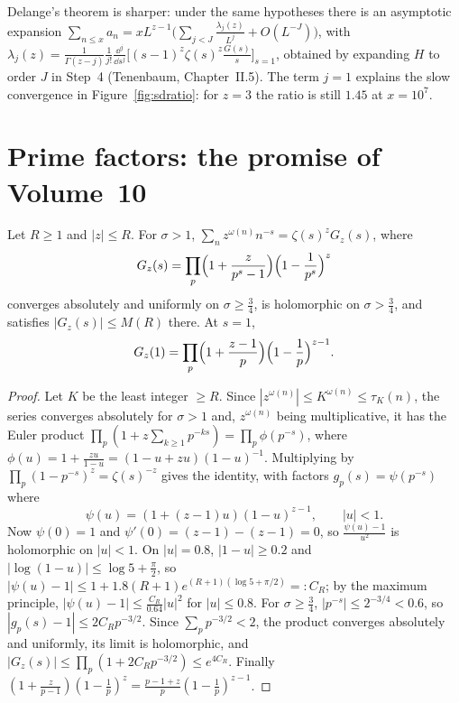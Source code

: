 \begin{remark}
Delange's theorem is sharper: under the same hypotheses there is an asymptotic expansion $\sum_{n\le x}a_n=xL^{z-1}\bigl(\sum_{j<J}\frac{\lambda_j(z)}{L^j}+O(L^{-J})\bigr)$, with $\lambda_j(z)=\frac1{\Gamma(z-j)}\frac1{j!}\frac{\dd^j}{\dd s^j}\bigl[(s-1)^z\zeta(s)^z\frac{G(s)}s\bigr]_{s=1}$, obtained by expanding $H$ to order $J$ in Step~4 (Tenenbaum, Chapter~II.5). The term $j=1$ explains the slow convergence in Figure~\ref{fig:sdratio}: for $z=3$ the ratio is still $1.45$ at $x=10^7$.
\end{remark}

\section{Prime factors: the promise of Volume~10}

\begin{lemma}\label{lem:eulerprod}
Let $R\ge1$ and $|z|\le R$. For $\sigma>1$, $\sum_nz^{\omega(n)}n^{-s}=\zeta(s)^zG_z(s)$, where
\[
G_z(s)=\prod_p\Bigl(1+\frac z{p^s-1}\Bigr)\Bigl(1-\frac1{p^s}\Bigr)^z
\]
converges absolutely and uniformly on $\sigma\ge\frac34$, is holomorphic on $\sigma>\frac34$, and satisfies $|G_z(s)|\le M(R)$ there. At $s=1$,
\[
G_z(1)=\prod_p\Bigl(1+\frac{z-1}p\Bigr)\Bigl(1-\frac1p\Bigr)^{z-1}.
\]
\end{lemma}
\begin{proof}
Let $K$ be the least integer $\ge R$. Since $|z^{\omega(n)}|\le K^{\omega(n)}\le\tau_K(n)$, the series converges absolutely for $\sigma>1$ and, $z^{\omega(n)}$ being multiplicative, it has the Euler product $\prod_p(1+z\sum_{k\ge1}p^{-ks})=\prod_p\phi(p^{-s})$, where $\phi(u)=1+\frac{zu}{1-u}=(1-u+zu)(1-u)^{-1}$. Multiplying by $\prod_p(1-p^{-s})^z=\zeta(s)^{-z}$ gives the identity, with factors $g_p(s)=\psi(p^{-s})$ where
\[
\psi(u)=(1+(z-1)u)(1-u)^{z-1},\qquad|u|<1.
\]
Now $\psi(0)=1$ and $\psi'(0)=(z-1)-(z-1)=0$, so $\frac{\psi(u)-1}{u^2}$ is holomorphic on $|u|<1$. On $|u|=0.8$, $|1-u|\ge0.2$ and $|\log(1-u)|\le\log5+\frac\pi2$, so $|\psi(u)-1|\le1+1.8(R+1)e^{(R+1)(\log5+\pi/2)}=:C_R$; by the maximum principle, $|\psi(u)-1|\le\frac{C_R}{0.64}|u|^2$ for $|u|\le0.8$. For $\sigma\ge\frac34$, $|p^{-s}|\le2^{-3/4}<0.6$, so $|g_p(s)-1|\le2C_Rp^{-3/2}$. Since $\sum_pp^{-3/2}<2$, the product converges absolutely and uniformly, its limit is holomorphic, and $|G_z(s)|\le\prod_p(1+2C_Rp^{-3/2})\le e^{4C_R}$. Finally $(1+\frac z{p-1})(1-\frac1p)^z=\frac{p-1+z}p(1-\frac1p)^{z-1}$.
\end{proof}

